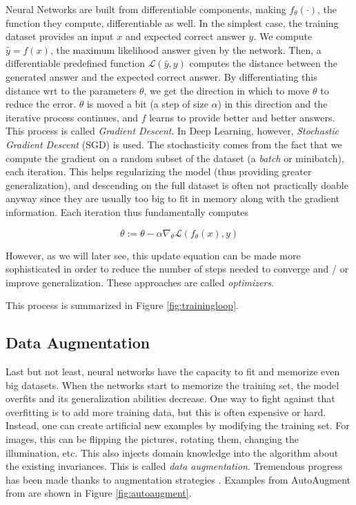 Neural Networks are built from differentiable components, making $f_\theta(\cdot)$, the function they compute, differentiable as well. In the simplest case, the training dataset provides an input $x$ and expected correct answer $y$. We compute $\hat{y}=f(x)$, the maximum likelihood answer given by the network. Then, a differentiable predefined function $\mathcal{L}(\hat{y}, y)$ computes the distance between the generated answer and the expected correct answer. By differentiating this distance wrt to the parameters $\theta$, we get the direction in which to move $\theta$ to reduce the error. $\theta$ is moved a bit (a step of size $\alpha$) in this direction and the iterative process continues, and $f$ learns to provide better and better answers. This process is called \emph{Gradient Descent}. In Deep Learning, however, \emph{Stochastic Gradient Descent} (SGD) is used. The stochasticity comes from the fact that we compute the gradient on a random subset of the dataset (a \emph{batch} or minibatch), each iteration. This helps regularizing the model (thus providing greater generalization), and descending on the full dataset is often not practically doable anyway since they are usually too big to fit in memory along with the gradient information. Each iteration thus fundamentally computes

\begin{equation}
    \theta := \theta - \alpha \nabla_\theta \mathcal{L}(f_\theta(x), y)
\end{equation}

However, as we will later see, this update equation can be made more sophisticated in order to reduce the number of steps needed to converge and / or improve generalization. These approaches are called \emph{optimizers}.

This process is summarized in Figure \ref{fig:trainingloop}.

\subsection{Data Augmentation}
\label{sec:trivialaugment}

Last but not least, neural networks have the capacity to fit and memorize even big datasets. When the networks start to memorize the training set, the model overfits and its generalization abilities decrease. One way to fight against that overfitting is to add more training data, but this is often expensive or hard. Instead, one can create artificial new examples by modifying the training set. For images, this can be flipping the pictures, rotating them, changing the illumination, etc. This also injects domain knowledge into the algorithm about the existing invariances. This is called \emph{data augmentation}. Tremendous progress has been made thanks to augmentation strategies \citep{cutmix,randaugment,mixup}. Examples from AutoAugment from \citet{autoaugment} are shown in Figure \ref{fig:autoaugment}.

